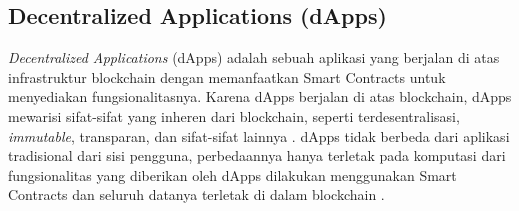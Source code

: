 \subsection{Decentralized Applications (dApps)}
\label{subsec:dapps}

\textit{Decentralized Applications} (dApps) adalah sebuah aplikasi yang berjalan di atas infrastruktur blockchain dengan memanfaatkan Smart Contracts untuk menyediakan fungsionalitasnya. Karena dApps berjalan di atas blockchain, dApps mewarisi sifat-sifat yang inheren dari blockchain, seperti terdesentralisasi, \textit{immutable}, transparan, dan sifat-sifat lainnya \parencite{investopedia2024}. dApps tidak berbeda dari aplikasi tradisional dari sisi pengguna, perbedaannya hanya terletak pada komputasi dari fungsionalitas yang diberikan oleh dApps dilakukan menggunakan Smart Contracts dan seluruh datanya terletak di dalam blockchain \parencite{metcalfe2020ethereum}.

